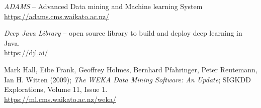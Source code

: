 
\begin{thebibliography}{999}

		\textit{ADAMS} -- Advanced Data mining and Machine learning System \\
		\url{https://adams.cms.waikato.ac.nz/}{}

		\textit{Deep Java Library} -- open source library to build and deploy deep learning in Java. \\
		\url{https://djl.ai/}{}

	 	Mark Hall, Eibe Frank, Geoffrey Holmes, Bernhard Pfahringer, Peter
	 	Reutemann, Ian H. Witten (2009); \textit{The WEKA Data Mining Software: An
	 	Update}; SIGKDD Explorations, Volume 11, Issue 1. \\
		\url{https://ml.cms.waikato.ac.nz/weka/}{}

\end{thebibliography}
